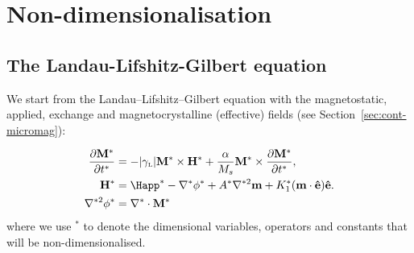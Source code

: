 
\section{Non-dimensionalisation}
\label{sec:normalisations-appendix}



\subsection{The Landau-Lifshitz-Gilbert equation}

We start from the Landau--Lifshitz--Gilbert equation with the magnetostatic, applied, exchange and magnetocrystalline (effective) fields (see Section~\ref{sec:cont-micromag}):

\begin{align}
  \pd{\Mv^*}{t^*} &= - \gymagc \Mv^* \times \Hv^* + \frac{\alpha}{M_s} \Mv^* \times \pd{\Mv^*}{t^*}, \label{eqn:llgnd} \\
  \Hv^* &= \Happ^* - \nabla^* \phi^* + \Exchc^* \nabla^{*2} \mv + \Kone^* (\mv \cdot \ev) \ev.
  \label{eqn:effnd} \\
  \nabla^{*2} \phi^* &= \nabla^* \cdot \Mv^* \label{eqn:phind}
\end{align}
where we use $^*$ to denote the dimensional variables, operators and constants that will be non-dimensionalised.



